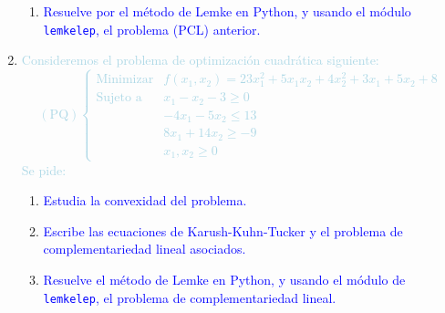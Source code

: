 \documentclass[a4paper]{article}
\newcommand{\lb}[1]{\textcolor{lightblue}{#1}}
\newcommand{\db}[1]{\textcolor{blue}{#1}}
\begin{document}
\begin{enumerate}[label=\color{red}\arabic*.]
\begin{enumerate}[label=\color{red}\alph*)]
    	\item \db{Resuelve por el método de Lemke en Python, y usando el módulo \texttt{lemkelep}, el problema (PCL) anterior.}
    \end{enumerate}
    \item \lb{Consideremos el problema de optimización cuadrática siguiente: \[ (\mathrm{PQ})\begin{cases}
    \text{Minimizar} & f(x_1,x_2)=23x_1^2+5x_1x_2+4x_2^2+3x_1+5x_2+8\\
    \text{Sujeto a} & x_1-x_2-3\ge0\\
    & -4x_1-5x_2\le13\\
    &8x_1+14x_2\ge-9\\
    &x_1,x_2\ge0
    \end{cases} \]Se pide:}
    \begin{enumerate}[label=\color{red}\alph*)]
    	\item \db{Estudia la convexidad del problema.}
    	
    	\item \db{Escribe las ecuaciones de Karush-Kuhn-Tucker y el problema de complementariedad lineal asociados.}
    	
    	\item \db{Resuelve el método de Lemke en Python, y usando el módulo de \texttt{lemkelep}, el problema de complementariedad lineal.}
    \end{enumerate}
\end{enumerate}
\end{document}
